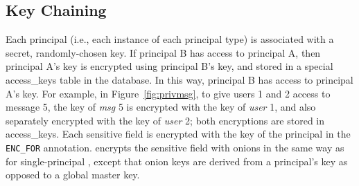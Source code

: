 



\subsection{Key Chaining}
\label{ss:keychain}

Each principal (i.e., each instance of each principal type) is associated
with a secret, randomly-chosen key.  If principal B has access to
principal A, then principal A's key is encrypted using principal B's
key, and stored in a special \textsf{access\_keys} table in the database.
In this way, principal B has access to principal A's key.  For example,
in Figure~\ref{fig:privmsg}, to give users 1 and 2 access to message 5,
the key of {\em msg} 5 is encrypted with the key of {\em user} 1, and
also separately encrypted with the key of {\em user} 2; both encryptions
are stored in \textsf{access\_keys}.  Each sensitive
field is encrypted with the key of the principal in the {\small \tt
ENC\_FOR} annotation. \name{} encrypts the sensitive field with
onions in the same way as for single-principal \name,
except that onion keys are derived from a principal's key as opposed to
a global master key.

